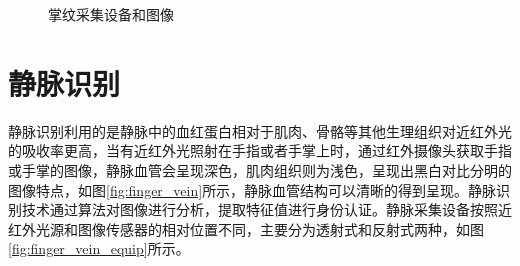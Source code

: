 \begin{figure}[ht]
\centering  %
\caption{掌纹采集设备和图像\cite{kong2009survey}}
\label{fig:palmprint}
\end{figure}

\section{静脉识别}
静脉识别利用的是静脉中的血红蛋白相对于肌肉、骨骼等其他生理组织对近红外光的吸收率更高，当有近红外光照射在手指或者手掌上时，通过红外摄像头获取手指或手掌的图像，静脉血管会呈现深色，肌肉组织则为浅色，呈现出黑白对比分明的图像特点，如图\ref{fig:finger_vein}所示，静脉血管结构可以清晰的得到呈现。静脉识别技术通过算法对图像进行分析，提取特征值进行身份认证。静脉采集设备按照近红外光源和图像传感器的相对位置不同，主要分为透射式和反射式两种，如图\ref{fig:finger_vein_equip}所示。


